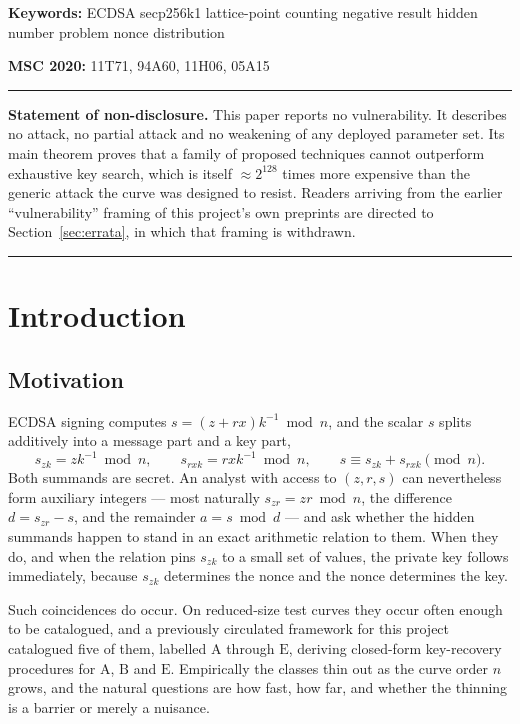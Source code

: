 \documentclass[11pt,a4paper]{article}
\theoremstyle{plain}
\theoremstyle{definition}
\theoremstyle{remark}
\newcommand{\szk}{s_{zk}}
\newcommand{\srxk}{s_{rxk}}
\newcommand{\szr}{s_{zr}}
\newcommand{\clA}{\mathrm{A}}
\newcommand{\clB}{\mathrm{B}}
\newcommand{\clE}{\mathrm{E}}
\begin{document}
\vspace{4pt}
\noindent\textbf{Keywords:} ECDSA \textperiodcentered{} secp256k1 \textperiodcentered{}
lattice-point counting \textperiodcentered{} negative result \textperiodcentered{}
hidden number problem \textperiodcentered{} nonce distribution

\vspace{2pt}
\noindent\textbf{MSC 2020:} 11T71, 94A60, 11H06, 05A15

\vspace{6pt}
\hrule
\vspace{4pt}
\noindent\small\textbf{Statement of non-disclosure.} This paper reports no vulnerability. It
describes no attack, no partial attack and no weakening of any deployed parameter set. Its main
theorem proves that a family of proposed techniques cannot outperform exhaustive key search, which
is itself $\approx 2^{128}$ times more expensive than the generic attack the curve was designed to
resist. Readers arriving from the earlier ``vulnerability'' framing of this project's own
preprints are directed to Section~\ref{sec:errata}, in which that framing is withdrawn.
\vspace{4pt}
\hrule

\section{Introduction}

\subsection{Motivation}

ECDSA signing computes $s = (z + rx)k^{-1} \bmod n$, and the scalar $s$ splits additively into a
message part and a key part,
\[
  \szk = zk^{-1} \bmod n, \qquad \srxk = rxk^{-1}\bmod n, \qquad s \equiv \szk + \srxk \pmod n .
\]
Both summands are secret. An analyst with access to $(z,r,s)$ can nevertheless form auxiliary
integers --- most naturally $\szr = zr \bmod n$, the difference $d = \szr - s$, and the remainder
$a = s \bmod d$ --- and ask whether the hidden summands happen to stand in an exact arithmetic
relation to them. When they do, and when the relation pins $\szk$ to a small set of values, the
private key follows immediately, because $\szk$ determines the nonce and the nonce determines the
key.

Such coincidences do occur. On reduced-size test curves they occur often enough to be catalogued,
and a previously circulated framework for this project catalogued five of them, labelled $\clA$
through $\clE$, deriving closed-form key-recovery procedures for $\clA$, $\clB$ and $\clE$.
Empirically the classes thin out as the curve order $n$ grows, and the natural questions are how
fast, how far, and whether the thinning is a barrier or merely a nuisance.
\end{document}
